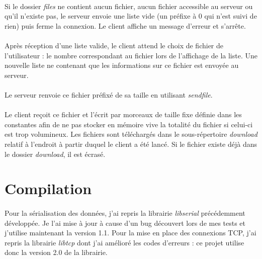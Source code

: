 \documentclass{article}
\begin{document}
    \paragraph{}
    Si le dossier \emph{files} ne contient aucun fichier, aucun fichier accessible au serveur ou qu'il n'existe pas, le serveur envoie une liste vide (un préfixe à 0 qui n'est suivi de rien) puis ferme la connexion. Le client affiche un message d'erreur et s'arrête.

    \paragraph{}
    Après réception d'une liste valide, le client attend le choix de fichier de l'utilisateur : le nombre correspondant au fichier lors de l'affichage de la liste. Une nouvelle liste ne contenant que les informations sur ce fichier est envoyée au serveur.

    \paragraph{}
    Le serveur renvoie ce fichier préfixé de sa taille en utilisant \emph{sendfile}.

    \paragraph{}
    Le client reçoit ce fichier et l'écrit par morceaux de taille fixe définie dans les constantes afin de ne pas stocker en mémoire vive la totalité du fichier si celui-ci est trop volumineux. Les fichiers sont téléchargés dans le sous-répertoire \emph{download} relatif à l'endroit à partir duquel le client a été lancé. Si le fichier existe déjà dans le dossier \emph{download}, il est écrasé.

    \section{Compilation}
    \paragraph{}
    Pour la sérialisation des données, j'ai repris la librairie \emph{libserial} précédemment développée. Je l'ai mise à jour à cause d'un bug découvert lors de mes tests et j'utilise maintenant la version 1.1. Pour la mise en place des connexions TCP, j'ai repris la librairie \emph{libtcp} dont j'ai amélioré les codes d'erreurs : ce projet utilise donc la version 2.0 de la librairie.
\end{document}

